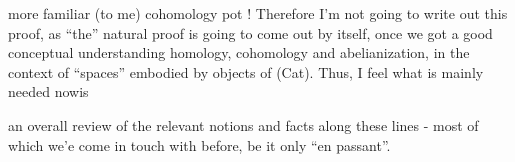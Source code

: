 more familiar (to me) cohomology pot ! Therefore I'm not going to write
out this proof, as ``the'' natural proof is going to come out by itself,
once we got a good conceptual understanding  homology, cohomology
and abelianization, in the context of  ``spaces''
embodied by objects of (Cat). Thus, I feel what is mainly needed now\hand{/}is

an overall review of the relevant notions and facts along these lines -
most of which we'e come in touch with before, be it only ``en passant''.

